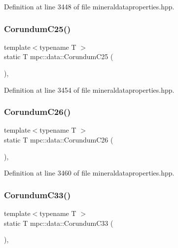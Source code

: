 Definition at line 3448 of file mineraldataproperties.\+hpp.

\mbox{\label{namespacempc_1_1data_a796a0549516d3ca6097b2df0fd089e51}} 
\subsubsection{\texorpdfstring{Corundum\+C25()}{CorundumC25()}}
{\footnotesize\ttfamily template$<$typename T $>$ \\
static T mpc\+::data\+::\+Corundum\+C25 (\begin{DoxyParamCaption}{ }\end{DoxyParamCaption})\hspace{0.3cm}{\ttfamily [inline]}, {\ttfamily [static]}}



Definition at line 3454 of file mineraldataproperties.\+hpp.

\mbox{\label{namespacempc_1_1data_a0c66b9336c273fac1f61de8066296585}} 
\subsubsection{\texorpdfstring{Corundum\+C26()}{CorundumC26()}}
{\footnotesize\ttfamily template$<$typename T $>$ \\
static T mpc\+::data\+::\+Corundum\+C26 (\begin{DoxyParamCaption}{ }\end{DoxyParamCaption})\hspace{0.3cm}{\ttfamily [inline]}, {\ttfamily [static]}}



Definition at line 3460 of file mineraldataproperties.\+hpp.

\mbox{\label{namespacempc_1_1data_a0998118d5bfefe62f2562754a455bc6f}} 
\subsubsection{\texorpdfstring{Corundum\+C33()}{CorundumC33()}}
{\footnotesize\ttfamily template$<$typename T $>$ \\
static T mpc\+::data\+::\+Corundum\+C33 (\begin{DoxyParamCaption}{ }\end{DoxyParamCaption})\hspace{0.3cm}{\ttfamily [inline]}, {\ttfamily [static]}}



